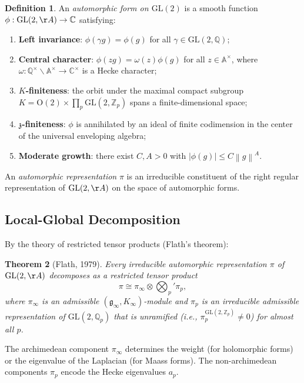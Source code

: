 \documentclass[12pt,a4paper]{amsart}
\newtheorem{theorem}{Theorem}[section]
\theoremstyle{definition}
\newtheorem{definition}[theorem]{Definition}
\newcommand{\ZZ}{\mathbb{Z}}
\newcommand{\QQ}{\mathbb{Q}}
\newcommand{\CC}{\mathbb{C}}
\newcommand{\AAring}{\mathbb{A}}
\newcommand{\GL}{\mathrm{GL}}
\newcommand{\norm}[1]{\left\|#1\right\|}
\begin{document}
\begin{definition}
An \emph{automorphic form on $\GL(2)$} is a smooth function
$\phi: \GL(2,\AA) \to \CC$ satisfying:
\begin{enumerate}[label=(\roman*)]
\item \textbf{Left invariance}: $\phi(\gamma g) = \phi(g)$ for all $\gamma \in \GL(2,\QQ)$;
\item \textbf{Central character}: $\phi(zg) = \omega(z)\phi(g)$ for all $z \in \AAring^\times$,
  where $\omega: \QQ^\times \backslash \AAring^\times \to \CC^\times$ is a Hecke character;
\item \textbf{$K$-finiteness}: the orbit under the maximal compact subgroup
  $K = \mathrm{O}(2) \times \prod_p \GL(2,\ZZ_p)$ spans a finite-dimensional space;
\item \textbf{$\mathfrak{z}$-finiteness}: $\phi$ is annihilated by an ideal of finite
  codimension in the center of the universal enveloping algebra;
\item \textbf{Moderate growth}: there exist $C, A > 0$ with $|\phi(g)| \leq C \norm{g}^A$.
\end{enumerate}
\end{definition}

An \emph{automorphic representation} $\pi$ is an irreducible constituent of the right
regular representation of $\GL(2,\AA)$ on the space of automorphic forms.

\subsection{Local-Global Decomposition}

By the theory of restricted tensor products (Flath's theorem):
\begin{theorem}[Flath, 1979]
Every irreducible automorphic representation $\pi$ of $\GL(2,\AA)$ decomposes as a
restricted tensor product
\[
\pi \cong \pi_\infty \otimes \bigotimes_p' \pi_p,
\]
where $\pi_\infty$ is an admissible $(\mathfrak{g}_\infty, K_\infty)$-module and
$\pi_p$ is an irreducible admissible representation of $\GL(2,\QQ_p)$ that is
unramified (i.e., $\pi_p^{\GL(2,\ZZ_p)} \neq 0$) for almost all $p$.
\end{theorem}

The archimedean component $\pi_\infty$ determines the weight (for holomorphic forms)
or the eigenvalue of the Laplacian (for Maass forms). The non-archimedean components
$\pi_p$ encode the Hecke eigenvalues $a_p$.

\end{document}
